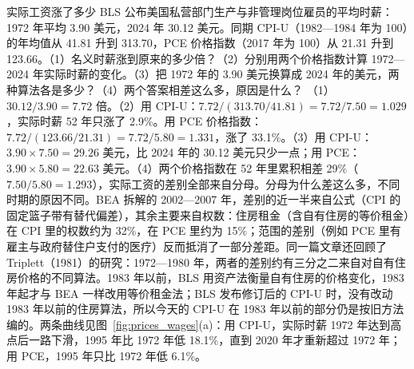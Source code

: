 \begin{example}{实际工资涨了多少}\label{ex:prices-wages}
BLS 公布美国私营部门生产与非管理岗位雇员的平均时薪：1972 年平均 3.90 美元，2024 年 30.12 美元。同期 CPI-U（1982—1984 年为 100）的年均值从 41.81 升到 313.70，PCE 价格指数（2017 年为 100）从 21.31 升到 123.66。（1）名义时薪涨到原来的多少倍？（2）分别用两个价格指数计算 1972—2024 年实际时薪的变化。（3）把 1972 年的 3.90 美元换算成 2024 年的美元，两种算法各是多少？（4）两个答案相差这么多，原因是什么？
\solution （1）$30.12/3.90=7.72$ 倍。（2）用 CPI-U：$7.72/(313.70/41.81)=7.72/7.50=1.029$，实际时薪 52 年只涨了 2.9\%。用 PCE 价格指数：$7.72/(123.66/21.31)=7.72/5.80=1.331$，涨了 33.1\%。（3）用 CPI-U：$3.90\times7.50=29.26$ 美元，比 2024 年的 30.12 美元只少一点；用 PCE：$3.90\times5.80=22.63$ 美元。（4）两个价格指数在 52 年里累积相差 29\%（$7.50/5.80=1.293$），实际工资的差别全部来自分母。分母为什么差这么多，不同时期的原因不同。BEA 拆解的 2002—2007 年，差别的近一半来自公式（CPI 的固定篮子带有替代偏差），其余主要来自权数：住房租金（含自有住房的等价租金）在 CPI 里的权数约为 32\%，在 PCE 里约为 15\%；范围的差别（例如 PCE 里有雇主与政府替住户支付的医疗）反而抵消了一部分差距。同一篇文章还回顾了 Triplett（1981）的研究：1972—1980 年，两者的差别约有三分之二来自对自有住房价格的不同算法。1983 年以前，BLS 用资产法衡量自有住房的价格变化，1983 年起才与 BEA 一样改用等价租金法\cite{mccully2007}；BLS 发布修订后的 CPI-U 时，没有改动 1983 年以前的住房算法\cite{boskin1996}，所以今天的 CPI-U 在 1983 年以前的部分仍是按旧方法编的。两条曲线见图~\ref{fig:prices_wages}(a)：用 CPI-U，实际时薪 1972 年达到高点后一路下滑，1995 年比 1972 年低 18.1\%，直到 2020 年才重新超过 1972 年；用 PCE，1995 年只比 1972 年低 6.1\%。
\end{example}


